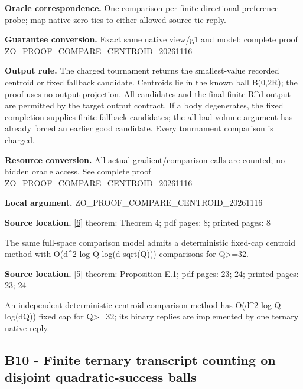 \documentclass[10pt,a4paper]{article}
\begin{document}
\textbf{Oracle correspondence.} One comparison per finite directional-preference probe; map native zero ties to either allowed source tie reply.



\textbf{Guarantee conversion.} Exact same native view/g1 and model; complete proof ZO\_PROOF\_COMPARE\_CENTROID\_20261116



\textbf{Output rule.} The charged tournament returns the smallest-value recorded centroid or fixed fallback candidate. Centroids lie in the known ball B(0,2R); the proof uses no output projection. All candidates and the final finite R\textasciicircum{}d output are permitted by the target output contract. If a body degenerates, the fixed completion supplies finite fallback candidates; the all-bad volume argument has already forced an earlier good candidate. Every tournament comparison is charged.



\textbf{Resource conversion.} All actual gradient/comparison calls are counted; no hidden oracle access. See complete proof ZO\_PROOF\_COMPARE\_CENTROID\_20261116



\textbf{Local argument.} ZO\_PROOF\_COMPARE\_CENTROID\_20261116



\textbf{Source location.} \href{https://github.com/WU-Wendao/Colombo/blob/main/colombo_sensorium/Complexity_altas/data/sources/colombo/COLOMBO_KIMI_002/kimi_002.pdf}{[6]} theorem: Theorem 4; pdf pages: 8; printed pages: 8



The same full-space comparison model admits a deterministic fixed-cap centroid method with O(d\textasciicircum{}2 log Q log(d sqrt(Q))) comparisons for Q>=32.



\textbf{Source location.} \href{https://arxiv.org/html/2611.29533v1}{[5]} theorem: Proposition E.1; pdf pages: 23; 24; printed pages: 23; 24



An independent deterministic centroid comparison method has O(d\textasciicircum{}2 log Q log(dQ)) fixed cap for Q>=32; its binary replies are implemented by one ternary native reply.



\subsection{B10 - Finite ternary transcript counting on disjoint quadratic-success balls}
\end{document}
